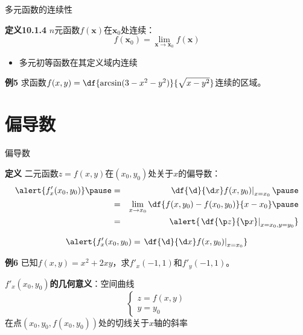 \begin{frame}{多元函数的连续性}
	\linespread{1.2}\pause 
	\begin{block}{{\bf 定义10.1.4}\hfill}
		{\bb $n$元函数$f(\bm{x})$在$\bm{x}_0$处连续：}
		$$f(\bm{x}_0)=\lim\limits_{\bm{x}\to\bm{x}_0}f(\bm{x})$$
	\end{block}\pause 
	\begin{itemize}
	  \item 多元初等函数在其定义域内连续\pause 
	\end{itemize}
	\begin{exampleblock}{{\bf 例5}\hfill}
		求函数$f(x,y)=\df{\arcsin(3-x^2-y^2)}{\sqrt{x-y^2}}$连续的区域。
	\end{exampleblock}
\end{frame}

\section{偏导数}

\begin{frame}{偏导数}
	\linespread{1.2}\pause 
	\begin{block}{{\bf 定义}\hfill}
		{\bb 二元函数$z=f(x,y)$在$(x_0,y_0)$处关于$x$的偏导数：}\pause 
		\begin{eqnarray*}
			\alert{f'_x(x_0,y_0)} \pause & = &
			\left.\df{\d}{\d x}f(x,y_0)\right|_{x=x_0}\pause \\ 
			& = & \lim\limits_{x\to x_0}\df{f(x,y_0)-f(x_0,y_0)}{x-x_0}\pause \\
			& = & \alert{\left.\df{\p z}{\p x}\right|_{x=x_0,y=y_0}}
		\end{eqnarray*}
	\end{block}\pause 
\end{frame}

\begin{frame}
	\linespread{1.2}
	$$\alert{f'_x(x_0,y_0)  =  \left.\df{\d}{\d x}f(x,y_0)\right|_{x=x_0}}$$\pause 
	\begin{exampleblock}{{\bf 例6}\hfill}
		已知$f(x,y)=x^2+2xy$，求$f'_x(-1,1)$和$f'_y(-1,1)$。
	\end{exampleblock}\pause 
	\alert{{\bf $f'_x(x_0,y_0)$的几何意义}：\pause 空间曲线
	$$\left\{\begin{array}{l}
	z=f(x,y)\\ y=y_0
	\end{array}\right.$$
	在点$(x_0,y_0,f(x_0,y_0))$处的切线关于$x$轴的斜率}
\end{frame}

